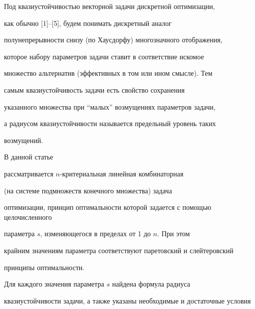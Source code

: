 \date{}




\pagestyle{plain} %







\maketitle


\label{begin}








Под квазиустойчивостью векторной задачи дискретной оптимизации,


как обычно [1]--[5], будем понимать дискретный аналог


полунепрерывности снизу (по Хаусдорфу) многозначного отображения,


которое набору параметров задачи ставит в соответствие искомое


множество альтернатив (эффективных в том или ином смысле). Тем


самым квазиустойчивость задачи есть свойство сохранения


указанного множества при ``малых'' возмущениях параметров задачи,


а радиусом квазиустойчивости называется предельный уровень таких


возмущений.





В данной статье


рассматривается $n$-критериальная линейная комбинаторная


(на системе подмножеств конечного множества) задача


оптимизации, принцип оптимальности которой задается с помощью целочисленного


параметра $s$, изменяющегося в пределах от 1 до $n$. При этом


крайним значениям параметра соответствуют паретовский и слейтеровский


принципы оптимальности.


Для каждого значения параметра $s$ найдена формула радиуса


квазиустойчивости задачи, а также указаны необходимые и достаточные условия


